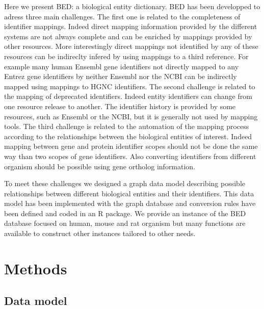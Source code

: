 \documentclass[9pt,a4paper,]{extarticle}
\theoremstyle{definition}
\theoremstyle{definition}
\theoremstyle{definition}
\theoremstyle{remark}
\begin{document}
Here we present BED: a biological entity dictionary.
BED has been developped to adress three main challenges.
The first one is related to the completeness of identifier mappings.
Indeed direct mapping information provided by the different
systems are not always complete and can be enriched by mappings provided
by other resources. More interestingly direct mappings not identified by
any of these resources can be indireclty infered by using mappings to a
third reference. For example many human Ensembl gene identifiers not
directly mapped to any Entrez gene identifiers by neither Ensembl nor the NCBI
can be indirectly mapped using mappings to HGNC identifiers.
The second challenge is related to the mapping of deprecated identifiers.
Indeed entity identifiers can change from one resource release to another.
The identifier history is provided by some resources, such as Ensembl or
the NCBI, but it is generally not used by mapping tools.
The third challenge is related to the automation of the mapping process
according to the relationships between the biological entities of interest.
Indeed mapping between gene and protein identifier scopes should not be done
the same way than two scopes of gene identifiers.
Also converting identifiers from different organism should be possible
using gene ortholog information.

To meet these challenges we designed a graph data model describing possible
relationships between different biological entities and their identifiers.
This data model has been implemented with the \neo{} graph
database \citep{neo4j_inc_neo4j_2017}
and conversion rules have been defined and coded in
an R \citep{r_core_team_r:_2017} package.
We provide an instance of the BED database focused on human, mouse and
rat organism but many functions are available to construct other instances
tailored to other needs.

\section{Methods}\label{methods}

\subsection{Data model}\label{data-model}
\end{document}
